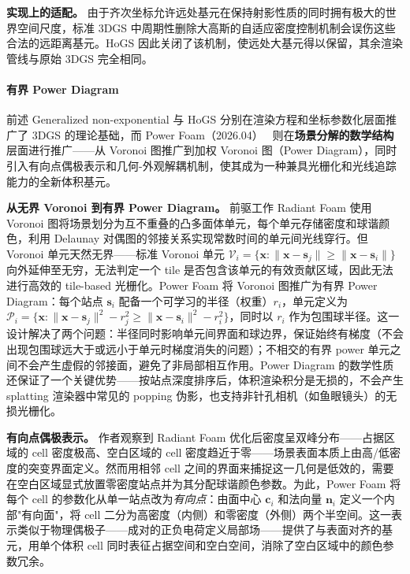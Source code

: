 \textbf{实现上的适配。}
由于齐次坐标允许远处基元在保持射影性质的同时拥有极大的世界空间尺度，标准 3DGS 中周期性删除大高斯的自适应密度控制机制会误伤这些合法的远距离基元。HoGS 因此关闭了该机制，使远处大基元得以保留，其余渲染管线与原始 3DGS 完全相同。

\paragraph{有界 Power Diagram}

前述 Generalized non-exponential 与 HoGS 分别在渲染方程和坐标参数化层面推广了 3DGS 的理论基础，而 Power Foam（2026.04）~\cite{2604_24994} 则在\textbf{场景分解的数学结构}层面进行推广——从 Voronoi 图推广到加权 Voronoi 图（Power Diagram），同时引入有向点偶极表示和几何-外观解耦机制，使其成为一种兼具光栅化和光线追踪能力的全新体积基元。

\textbf{从无界 Voronoi 到有界 Power Diagram。}
前驱工作 Radiant Foam 使用 Voronoi 图将场景划分为互不重叠的凸多面体单元，每个单元存储密度和球谐颜色，利用 Delaunay 对偶图的邻接关系实现常数时间的单元间光线穿行。但 Voronoi 单元天然无界——标准 Voronoi 单元 $\mathcal{V}_i = \{\mathbf{x} : \|\mathbf{x}-\mathbf{s}_j\| \geq \|\mathbf{x}-\mathbf{s}_i\|\}$ 向外延伸至无穷，无法判定一个 tile 是否包含该单元的有效贡献区域，因此无法进行高效的 tile-based 光栅化。Power Foam 将 Voronoi 图推广为有界 Power Diagram：每个站点 $\mathbf{s}_i$ 配备一个可学习的半径（权重）$r_i$，单元定义为 $\mathcal{P}_i = \{\mathbf{x} : \|\mathbf{x}-\mathbf{s}_j\|^2 - r_j^2 \geq \|\mathbf{x}-\mathbf{s}_i\|^2 - r_i^2\}$，同时以 $r_i$ 作为包围球半径。这一设计解决了两个问题：半径同时影响单元间界面和球边界，保证始终有梯度（不会出现包围球远大于或远小于单元时梯度消失的问题）；不相交的有界 power 单元之间不会产生虚假的邻接面，避免了非局部相互作用。Power Diagram 的数学性质还保证了一个关键优势——按站点深度排序后，体积渲染积分是无损的，不会产生 splatting 渲染器中常见的 popping 伪影，也支持非针孔相机（如鱼眼镜头）的无损光栅化。

\textbf{有向点偶极表示。}
作者观察到 Radiant Foam 优化后密度呈双峰分布——占据区域的 cell 密度极高、空白区域的 cell 密度趋近于零——场景表面本质上由高/低密度的突变界面定义。然而用相邻 cell 之间的界面来捕捉这一几何是低效的，需要在空白区域显式放置零密度站点并为其分配球谐颜色参数。为此，Power Foam 将每个 cell 的参数化从单一站点改为\emph{有向点}：由面中心 $\mathbf{c}_i$ 和法向量 $\mathbf{n}_i$ 定义一个内部"有向面"，将 cell 二分为高密度（内侧）和零密度（外侧）两个半空间。这一表示类似于物理偶极子——成对的正负电荷定义局部场——提供了与表面对齐的基元，用单个体积 cell 同时表征占据空间和空白空间，消除了空白区域中的颜色参数冗余。

